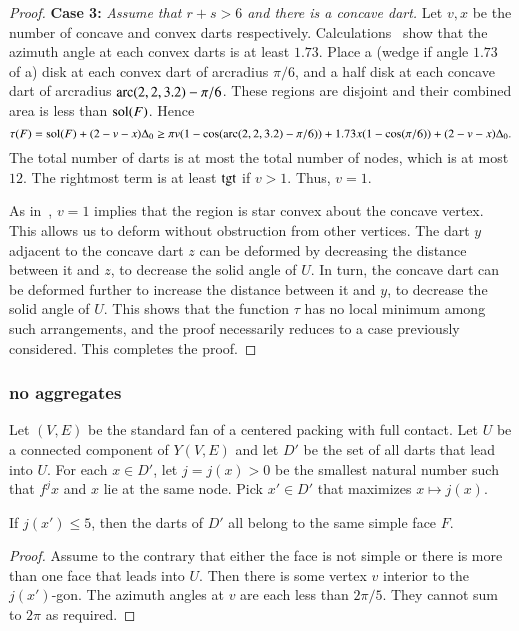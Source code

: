 \begin{proof}
{\bf Case 3:}
{\it Assume that $r+s>6$ and there is a concave dart.}  Let $v,x$ be the number of concave and convex darts respectively.  Calculations~\cite[cc:lft]{hales:2009:nonlinear} show that the azimuth angle at each convex darts is at least $1.73$.  Place a (wedge if angle $1.73$ of a) disk at each convex dart of arcradius $\pi/6$, and a half disk at each concave dart of arcradius $\operatorname{arc}(2,2,3.2)-\pi/6$.  These regions are disjoint and their combined area is less than $\operatorname{sol}(F)$.  Hence
$$
\tau(F)=\operatorname{sol}(F)+(2-v-x)\Delta_0 \ge \pi v (1-\cos(\operatorname{arc}(2,2,3.2)-\pi/6)) + 1.73 x (1-\cos(\pi/6)) + (2-v-x)\Delta_0.
$$
The total number of darts is at most the total number of nodes, which is at most $12$.  The rightmost term is at least ${\operatorname{tgt}}$ if $v> 1$. Thus, $v=1$.
%
%

As in~\cite{Hales:2006:DCG}, $v=1$ implies that the region is star convex about the concave vertex.  This allows us to deform without obstruction from other vertices.  The dart $y$ adjacent to the concave dart $z$ can be deformed by decreasing the distance between it and $z$, to decrease the solid angle of $U$.  In turn, the concave dart can be deformed further to increase the distance between it and $y$, to decrease the solid angle of $U$.  This shows that the function $\tau$ has no local minimum among such arrangements, and the proof necessarily reduces to a case previously considered.  This completes the proof.
\end{proof}
%
%

\subsubsection{no aggregates}

Let $(V,E)$ be the standard fan of a centered packing with full contact.  Let $U$ be a connected component of $Y(V,E)$ and let $D'$ be the set of all darts that lead into $U$.  For each $x\in D'$, let $j = j(x) >0$ be the smallest natural number such that $f^j x$ and $x$ lie at the same node.  Pick $x'\in D'$ that maximizes $x\mapsto j(x)$.  
%
%

\begin{lemma}\label{lemma:DU}  If $j(x')\le 5$, then the darts of $D'$ all belong to the same simple face $F$.
\end{lemma}
%

\begin{proof} Assume to the contrary that either the face is not simple or there is more than one face that leads into $U$.  Then there is some vertex $v$ interior to the $j(x')$-gon.  The azimuth angles at $v$ are each less than $2\pi/5$. They cannot sum to $2\pi$ as required.
\end{proof}

